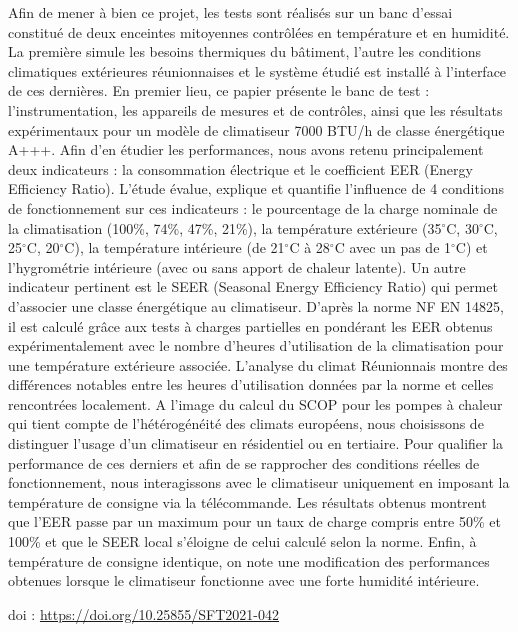 {Afin de mener à bien ce projet, les tests sont réalisés sur un banc d'essai constitué de deux enceintes mitoyennes contrôlées en température et en humidité. La première simule les besoins thermiques du bâtiment, l'autre les conditions climatiques extérieures réunionnaises et le système étudié est installé à l'interface de ces dernières. En premier lieu, ce papier présente le banc de test : l'instrumentation, les appareils de mesures et de contrôles, ainsi que les résultats expérimentaux pour un modèle de climatiseur 7000 BTU/h de classe énergétique A+++. Afin d'en étudier les performances, nous avons retenu principalement deux indicateurs : la consommation électrique et le coefficient EER (Energy Efficiency Ratio). L'étude évalue, explique et quantifie l'influence de 4 conditions de fonctionnement sur ces indicateurs : le pourcentage de la charge nominale de la climatisation (100\%, 74\%, 47\%, 21\%), la température extérieure (35$^{\circ}$C, 30$^{\circ}$C, 25$^{\circ}$C, 20$^{\circ}$C), la température intérieure (de 21$^{\circ}$C à 28$^{\circ}$C avec un pas de 1$^{\circ}$C) et l'hygrométrie intérieure (avec ou sans apport de chaleur latente). Un autre indicateur pertinent est le SEER (Seasonal Energy Efficiency Ratio) qui permet d'associer une classe énergétique au climatiseur. D'après la norme NF EN 14825, il est calculé grâce aux tests à charges partielles en pondérant les EER obtenus expérimentalement avec le nombre d'heures d'utilisation de la climatisation pour une température extérieure associée. L'analyse du climat Réunionnais montre des différences notables entre les heures d'utilisation données par la norme et celles rencontrées localement. A l'image du calcul du SCOP pour les pompes à chaleur qui tient compte de l'hétérogénéité des climats européens, nous choisissons de distinguer l'usage d'un climatiseur en résidentiel ou en tertiaire. Pour qualifier la performance de ces derniers et afin de se rapprocher des conditions réelles de fonctionnement, nous interagissons avec le climatiseur uniquement en imposant la température de consigne via la télécommande. Les résultats obtenus montrent que l'EER passe par un maximum pour un taux de charge compris entre 50\% et 100\% et que le SEER local s'éloigne de celui calculé selon la norme. Enfin, à température de consigne identique, on note une modification des performances obtenues lorsque le climatiseur fonctionne avec une forte humidité intérieure.

 \vfill doi : \url{https://doi.org/10.25855/SFT2021-042}

}
 
